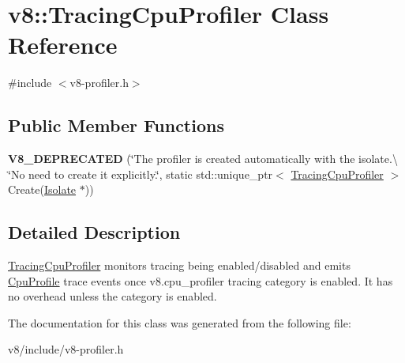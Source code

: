 \hypertarget{classv8_1_1TracingCpuProfiler}{}\section{v8\+:\+:Tracing\+Cpu\+Profiler Class Reference}
\label{classv8_1_1TracingCpuProfiler}


{\ttfamily \#include $<$v8-\/profiler.\+h$>$}

\subsection*{Public Member Functions}
\begin{DoxyCompactItemize}
\item 
\mbox{\label{classv8_1_1TracingCpuProfiler_a678cada2e0ab33acb35dac443d626fab}} 
{\bfseries V8\+\_\+\+D\+E\+P\+R\+E\+C\+A\+T\+ED} (\char`\"{}The profiler is created automatically with the isolate.\textbackslash{} \char`\"{}No need to create it explicitly.\char`\"{}, static std\+::unique\+\_\+ptr$<$ \mbox{\hyperlink{classv8_1_1TracingCpuProfiler}{Tracing\+Cpu\+Profiler}} $>$ Create(\mbox{\hyperlink{classv8_1_1Isolate}{Isolate}} $\ast$))
\end{DoxyCompactItemize}


\subsection{Detailed Description}
\mbox{\hyperlink{classv8_1_1TracingCpuProfiler}{Tracing\+Cpu\+Profiler}} monitors tracing being enabled/disabled and emits \mbox{\hyperlink{classv8_1_1CpuProfile}{Cpu\+Profile}} trace events once v8.\+cpu\+\_\+profiler tracing category is enabled. It has no overhead unless the category is enabled. 

The documentation for this class was generated from the following file\+:\begin{DoxyCompactItemize}
\item 
v8/include/v8-\/profiler.\+h\end{DoxyCompactItemize}
